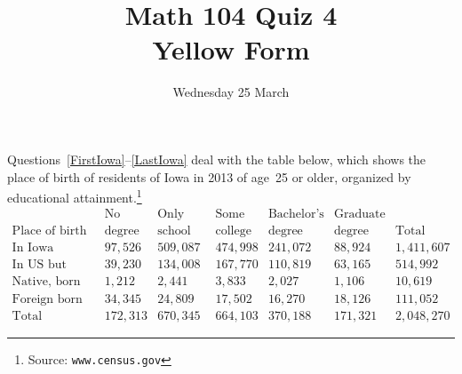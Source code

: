 \documentclass[answers,12pt]{exam}
\title{Math 104 Quiz 4\\Yellow Form}
\date{Wednesday 25 March}
\begin{document}
\maketitle
\thispagestyle{empty}
\begin{center}
\end{center}

Questions~\ref{FirstIowa}--\ref{LastIowa} deal with
the table below, which shows the place of birth of 
residents of Iowa 
in 2013 of age~25 or older,
organized by educational
attainment.\footnote{
Source: \tt www.census.gov}
\[\begin{array}{r|rrrrr|r}

&\text{No}&\text{Only high}&\text{Some}&\text{Bachelor's}&\text{Graduate}\\
\text{Place of birth}&\text{degree}
&\text{school}&\text{college}&\text{degree}&\text{degree}&\text{Total}
\\\hline
\text{In Iowa}
&97,526&509,087&474,998&241,072&88,924&1,411,607\\
\text{In US but outside Iowa}
&39,230&134,008&167,770&110,819&63,165&514,992\\
\text{Native, born outside US}
&1,212&2,441&3,833&2,027&1,106&10,619\\
\text{Foreign born}
&34,345&24,809&17,502&16,270&18,126&111,052\\\hline
\text{Total}
&172,313&670,345&664,103&370,188&171,321&2,048,270
\end{array}\]
\end{document}
